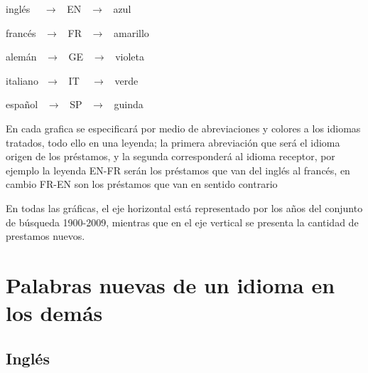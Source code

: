 inglés   $\,\,\,\,\,\, \rightarrow \,\,\,$   EN   $\,\,\,\rightarrow\,\,\,$  azul

francés  $\,\,\,       \rightarrow \,\,\,$   FR   $\,\,\,\rightarrow\,\,\,$  amarillo

alemán   $\,\,\,       \rightarrow \,\,\,$   GE   $\,\,\,\rightarrow\,\,\,$  violeta

italiano $\,\,          \rightarrow \,\,\,$  IT   $\,\,\,\,\,\rightarrow\,\,\,$  verde

español  $\,\,\,       \rightarrow \,\,\,$  SP   $\,\,\,\rightarrow\,\,\,$  guinda



En cada grafica se especificará por medio de  abreviaciones y  colores a los
idiomas tratados, todo ello en una leyenda; la primera abreviación que será el
idioma origen de los préstamos, y la segunda corresponderá al idioma receptor,
por ejemplo  la leyenda EN-FR serán los préstamos que van del inglés al
francés, en cambio FR-EN son los préstamos que van en sentido contrario

En todas las gráficas, el eje horizontal está representado por los años del
conjunto de búsqueda 1900-2009,  mientras que en el eje vertical se presenta la
cantidad de prestamos nuevos. 
\section{Palabras nuevas de un idioma en los demás} %
\subsection{Inglés} %

